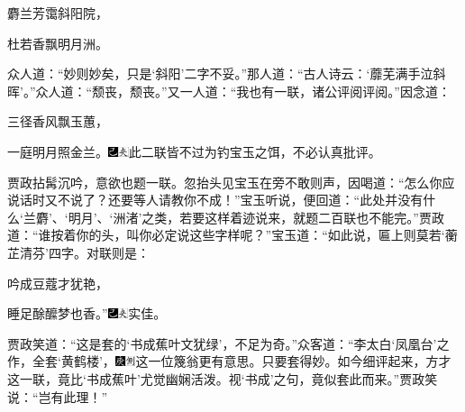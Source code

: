 麝兰芳霭斜阳院，

杜若香飘明月洲。

众人道：“妙则妙矣，只是‘斜阳’二字不妥。”那人道：“古人诗云：‘蘼芜满手泣斜晖’。”众人道：“颓丧，颓丧。”又一人道：“我也有一联，诸公评阅评阅。”因念道：

三径香风飘玉蕙，

一庭明月照金兰。{\includegraphics[width=3mm]{../Images/00003}\includegraphics[width=3mm]{../Images/00012}\footnotesize \kaishu 此二联皆不过为钓宝玉之饵，不必认真批评。}

贾政拈髯沉吟，意欲也题一联。忽抬头见宝玉在旁不敢则声，因喝道：“怎么你应说话时又不说了？还要等人请教你不成！”宝玉听说，便回道：“此处并没有什么‘兰麝’、‘明月’、‘洲渚’之类，若要这样着迹说来，就题二百联也不能完。”贾政道：“谁按着你的头，叫你必定说这些字样呢？”宝玉道：“如此说，匾上则莫若‘蘅芷清芬’四字。对联则是：

吟成豆蔻才犹艳，

睡足酴醿梦也香。”{\includegraphics[width=3mm]{../Images/00003}\includegraphics[width=3mm]{../Images/00012}\footnotesize \kaishu 实佳。}

贾政笑道：“这是套的‘书成蕉叶文犹绿’，不足为奇。”众客道：“李太白‘凤凰台’之作，全套‘黄鹤楼’，{\includegraphics[width=3mm]{../Images/00004}\includegraphics[width=3mm]{../Images/00011}\footnotesize \kaishu 这一位篾翁更有意思。}只要套得妙。如今细评起来，方才这一联，竟比‘书成蕉叶’尤觉幽娴活泼。视‘书成’之句，竟似套此而来。”贾政笑说：“岂有此理！”

